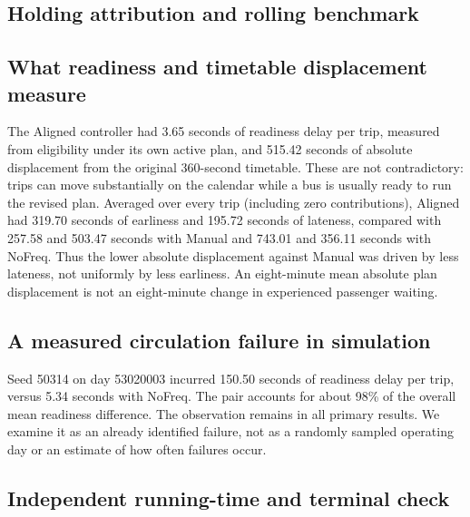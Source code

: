 \subsection{Holding attribution and rolling benchmark}


\subsection{What readiness and timetable displacement measure}
The Aligned controller had 3.65 seconds of readiness delay per trip, measured from eligibility under its own active plan, and 515.42 seconds of absolute displacement from the original 360-second timetable. These are not contradictory: trips can move substantially on the calendar while a bus is usually ready to run the revised plan. Averaged over every trip (including zero contributions), Aligned had 319.70 seconds of earliness and 195.72 seconds of lateness, compared with 257.58 and 503.47 seconds with Manual and 743.01 and 356.11 seconds with NoFreq. Thus the lower absolute displacement against Manual was driven by less lateness, not uniformly by less earliness. An eight-minute mean absolute plan displacement is not an eight-minute change in experienced passenger waiting.

\subsection{A measured circulation failure in simulation}
Seed 50314 on day 53020003 incurred 150.50 seconds of readiness delay per trip, versus 5.34 seconds with NoFreq. The pair accounts for about 98\% of the overall mean readiness difference. The observation remains in all primary results. We examine it as an already identified failure, not as a randomly sampled operating day or an estimate of how often failures occur.


\subsection{Independent running-time and terminal check}


